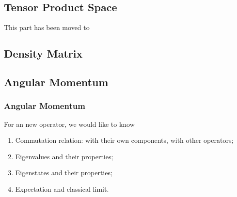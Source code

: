 \documentclass[letterpaper,10pt,english]{sphinxmanual}
\begin{document}
\subsection{Tensor Product Space}
\label{Quantum/QuantumMechanics2:tensor-product-space}
This part has been moved to {\hyperref[math:tensorproductspace]{\emph{}}}


\subsection{Density Matrix}
\label{Quantum/QuantumMechanics2:density-matrix}

\subsection{Angular Momentum}
\label{Quantum/QuantumMechanics2:angular-momentum}

\subsubsection{Angular Momentum}
\label{Quantum/QuantumMechanics2:id1}
For an new operator, we would like to know
\begin{enumerate}
\item {} 
Commutation relation: with their own components, with other operators;

\item {} 
Eigenvalues and their properties;

\item {} 
Eigenstates and their properties;

\item {} 
Expectation and classical limit.

\end{enumerate}
\end{document}
